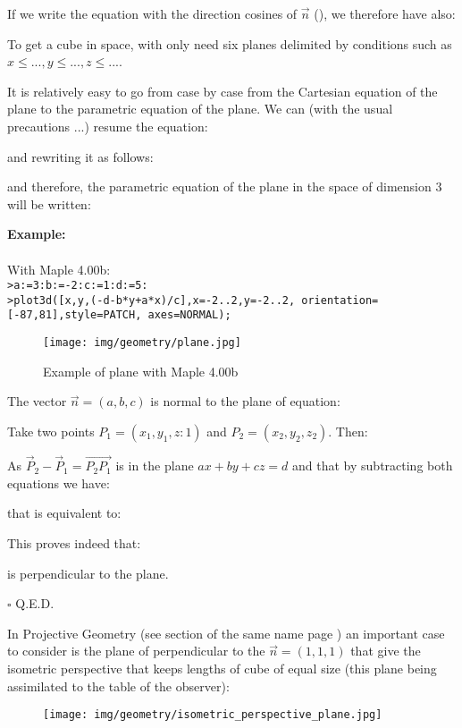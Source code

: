 	If we write the equation with the direction cosines of $\vec{n}$ (), we therefore have also:
	
	\begin{tcolorbox}[title=Remark,colframe=black,arc=10pt]
	To get a cube in space, with only need six planes delimited by conditions such as $x\leq...,y\leq...,z\leq...$.
	\end{tcolorbox}	
	It is relatively easy to go from case by case from the Cartesian equation of the plane to the parametric equation of the plane. We can (with the usual precautions ...) resume the equation:
	
	and rewriting it as follows:
	
	and therefore, the parametric equation of the plane in the space of dimension $3$ will be written:
	
	\begin{tcolorbox}[colframe=black,colback=white,sharp corners]
	\textbf{{\Large {}}Example:}\\\\
	With Maple 4.00b:\\

	\texttt{>a:=3:b:=-2:c:=1:d:=5:\\
	>plot3d([x,y,(-d-b*y+a*x)/c],x=-2..2,y=-2..2, orientation=[-87,81],style=PATCH,
axes=NORMAL);
	}
	\begin{figure}[H]
		\centering
		\texttt{[image: img/geometry/plane.jpg]}
		\caption{Example of plane with Maple 4.00b}
	\end{figure}
	\end{tcolorbox}
	\begin{theorem}
	The vector $\vec{n}=(a,b,c)$ is normal to the plane of equation:
	
	\end{theorem}
	\begin{dem}
	Take two points $P_1=(x_1,y_1,z:1)$ and $P_2=(x_2,y_2,z_2)$. Then:
	
	As $\vec{P}_2-\vec{P}_1=\overrightarrow{P_2P_1}$ is in the plane $ax+by+cz=d$ and that by subtracting both equations we have:
	
	that is equivalent to:
	
	This proves indeed that\label{vector normal plane}:
	
	is perpendicular to the plane.
	\begin{flushright}
		$\square$  Q.E.D.
	\end{flushright}
	\end{dem}
	In Projective Geometry (see section of the same name page \pageref{projective geometry}) an important case to consider is the plane of perpendicular to the $\vec{n}=(1,1,1)$ that give the isometric perspective that keeps lengths of cube of equal size (this plane being assimilated to the table of the observer)\label{isometric plane}:
	\begin{figure}[H]
		\centering
		\texttt{[image: img/geometry/isometric\_perspective\_plane.jpg]}
	\end{figure}

